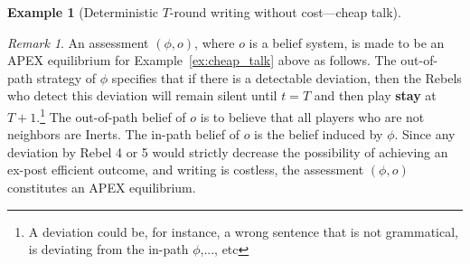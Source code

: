 \documentclass[12pt,letter]{article}
\newcommand\omicron{o}
\theoremstyle{definition}
\newtheorem{example}{Example}
\theoremstyle{remark}
\newtheorem*{remark}{Remark}
\theoremstyle{claim}
\begin{document}
\begin{example}[Deterministic $T$-round writing without cost---cheap talk]


\end{example}

\begin{remark}
An assessment $(\phi,\omicron)$, where $\omicron$ is a belief system, is made to be an APEX equilibrium for Example~\ref{ex:cheap_talk} above as follows. The out-of-path strategy of $\phi$ specifies that if there is a detectable deviation, then the Rebels who detect this deviation will remain silent until $t=T$ and then play \textbf{stay} at $T+1$.\footnote{A deviation could be, for instance, a wrong sentence that is not grammatical, is deviating from the in-path $\phi$,..., etc} 
The out-of-path belief of $\omicron$ is to believe that all players who are not neighbors are Inerts. The in-path belief of $\omicron$ is the belief induced by $\phi$. Since any deviation by Rebel 4 or 5 would strictly decrease the possibility of achieving an ex-post efficient outcome, and writing is costless, the assessment $(\phi,\omicron)$ constitutes an APEX equilibrium.
\end{remark}
%
\end{document}
